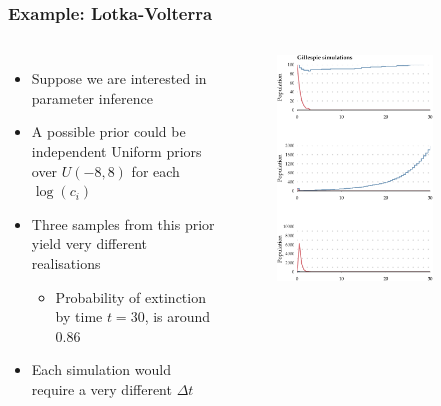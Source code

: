\documentclass[t,compress]{beamer}
\begin{document}
\begin{frame}
\frametitle{Example: Lotka-Volterra}

\begin{columns}[t]
\begin{itemize}
\item Suppose we are interested in parameter inference
\item A possible prior could be independent Uniform priors over $U(-8, 8)$ for
  each $\log(c_i)$
\item Three samples from this prior yield very different realisations
\begin{itemize}
\item Probability of extinction by time $t=30$, is around 0.86
\end{itemize}
\item Each simulation would require a very different $\Delta t$
\end{itemize}
\vspace{-1cm}
\begin{figure}
\centering
\includegraphics[width=0.8\textwidth]{figure2-crop}
\end{figure}
\vfill
\end{columns}
\end{frame}
\end{document}
